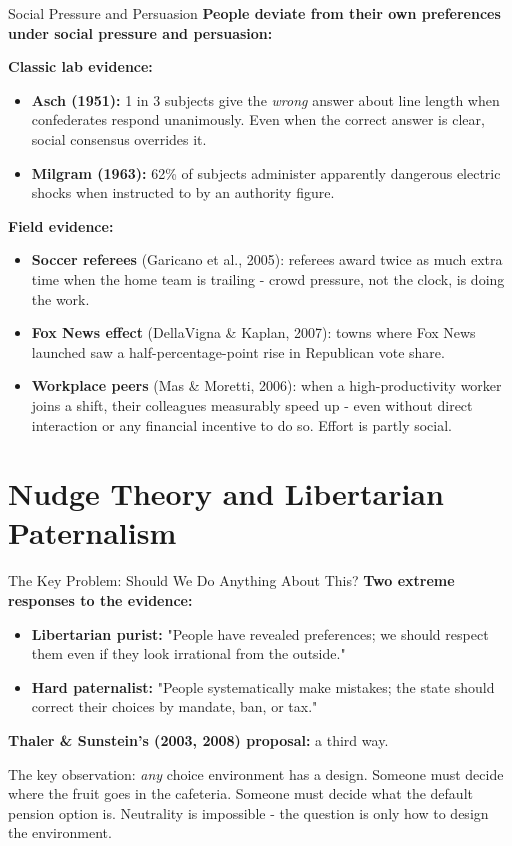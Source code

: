 \documentclass[10pt]{beamer}
\begin{document}
\begin{frame}[allowframebreaks]{Social Pressure and Persuasion}
\textbf{People deviate from their own preferences under social pressure and persuasion:}

\textbf{Classic lab evidence:}
\begin{itemize}
  \item \textbf{Asch (1951):} 1 in 3 subjects give the \emph{wrong} answer about line length when confederates respond unanimously. Even when the correct answer is clear, social consensus overrides it.

\item \textbf{Milgram (1963):} 62\% of subjects administer apparently dangerous
electric shocks when instructed to by an authority figure.
\end{itemize}

\textbf{Field evidence:}
\begin{itemize}
\item \textbf{Soccer referees} (Garicano et al., 2005): referees award twice
as much extra time when the home team is trailing - crowd pressure, not
the clock, is doing the work.

\item \textbf{Fox News effect} (DellaVigna \& Kaplan, 2007): towns where Fox
News launched saw a half-percentage-point rise in Republican vote share.

\item \textbf{Workplace peers} (Mas \& Moretti, 2006): when a high-productivity
worker joins a shift, their colleagues measurably speed up - even without
direct interaction or any financial incentive to do so. Effort is partly social.
\end{itemize}
\end{frame}


\section{Nudge Theory and Libertarian Paternalism}

\begin{frame}{The Key Problem: Should We Do Anything About This?}
\textbf{Two extreme responses to the evidence:}


\begin{itemize}
\item \textbf{Libertarian purist:} "People have revealed preferences; we should respect them even if they look irrational from the outside."


\item \textbf{Hard paternalist:} "People systematically make mistakes; the state should correct their choices by mandate, ban, or tax."
\end{itemize}


\textbf{Thaler \& Sunstein's (2003, 2008) proposal:} a \alert{third way}.


The key observation: \emph{any} choice environment has a design.
Someone must decide where the fruit goes in the cafeteria.
Someone must decide what the default pension option is.
\alert{Neutrality is impossible - the question is only how to design the environment.}
\end{frame}
\end{document}
